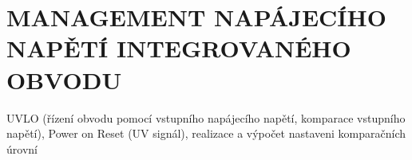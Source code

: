 \section{MANAGEMENT NAPÁJECÍHO NAPĚTÍ INTEGROVANÉHO OBVODU}
UVLO (řízení obvodu pomocí vstupního napájecího napětí, komparace vstupního napětí), Power on Reset (UV signál), realizace a výpočet nastaveni komparačních úrovní



